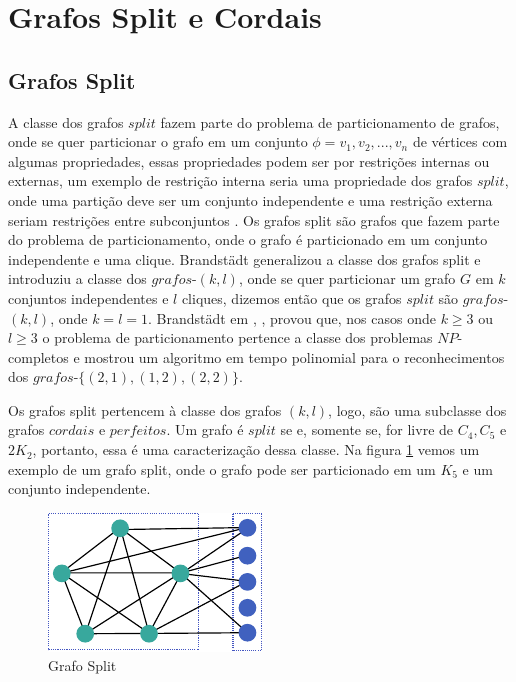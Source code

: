 \section{Grafos Split e Cordais} \label{sec:firstpage}

\subsection{Grafos Split}

A classe dos grafos $split$ fazem parte do problema de particionamento de grafos, onde se quer particionar o grafo em um conjunto $\phi = v_1, v_2, ..., v_n$ de vértices com algumas propriedades, essas propriedades podem ser por restrições internas ou externas, um exemplo de restrição interna seria uma propriedade dos grafos $split$, onde uma partição deve ser um conjunto independente e uma restrição externa seriam restrições entre subconjuntos \cite{fernanda:2016}. Os grafos split são grafos que fazem parte do problema de particionamento, onde o grafo é particionado em um conjunto independente e uma clique. Brandstädt \cite{brand:96} generalizou a classe dos grafos split e introduziu a classe dos $grafos$-$(k,l)$, onde se quer particionar um grafo $G$ em $k$ conjuntos independentes e $l$ cliques, dizemos então que os grafos $split$ são $grafos$-$(k,l)$, onde $k = l = 1$. Brandstädt em \cite{brand:96}, \cite{brand:98}, \cite{brand:2005} provou que, nos casos onde $k \geq 3$ ou $l \geq 3$ o problema de particionamento pertence a classe dos problemas $NP$-completos e mostrou um algoritmo em tempo polinomial para o reconhecimentos dos $grafos$-$\{(2,1), (1,2), (2,2)\}$.

Os grafos split pertencem à classe dos grafos $(k,l)$, logo, são uma subclasse dos grafos $cordais$ e $perfeitos$. Um grafo é $split$ se e, somente se, for livre de  $C_4, C_5$ e $2K_2$, portanto, essa é uma caracterização dessa classe. Na figura \ref{fig:split_1_1} vemos um exemplo de um grafo split, onde o grafo pode ser particionado em um $K_5$ e um conjunto independente.

\begin{figure}
    \centering
    \includegraphics[scale=2]{pictures/(1_1)_graph.pdf}
    \caption{Grafo Split}
    \label{fig:split_1_1}
\end{figure}

